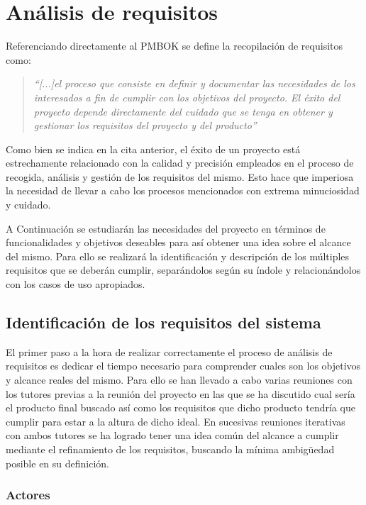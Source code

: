 \chapter{Análisis de requisitos}

Referenciando directamente al PMBOK se define la recopilación de requisitos como:

\begin{quote}
	\textit{
	“[...]el proceso que consiste en definir y documentar las necesidades de los interesados
	a fin de cumplir con los objetivos del proyecto. El éxito del proyecto depende directamente
	del cuidado que se tenga en obtener y gestionar los requisitos del proyecto y del
	producto”
	}
\end{quote}

Como bien se indica en la cita anterior, el éxito de un proyecto está estrechamente relacionado con la calidad y precisión empleados en el proceso de recogida, análisis y gestión de los requisitos del mismo. Esto hace que imperiosa la necesidad de llevar a cabo los procesos mencionados con extrema minuciosidad y cuidado.

\bigskip

A Continuación se estudiarán las necesidades del proyecto en términos de funcionalidades y objetivos deseables para así obtener una idea sobre el alcance del mismo. Para ello se realizará la identificación y descripción de los múltiples requisitos que se deberán cumplir, separándolos según su índole y relacionándolos con los casos de uso apropiados.

\section{Identificación de los requisitos del sistema}

El primer paso a la hora de realizar correctamente el proceso de análisis de requisitos es dedicar el tiempo necesario para comprender cuales son los objetivos y alcance reales del mismo. Para ello se han llevado a cabo varias reuniones con los tutores previas a la reunión del proyecto en las que se ha discutido cual sería el producto final buscado así como los requisitos que dicho producto tendría que cumplir para estar a la altura de dicho ideal. En sucesivas reuniones iterativas con ambos tutores se ha logrado tener una idea común del alcance a cumplir mediante el refinamiento de los requisitos, buscando la mínima ambigüedad posible en su definición.

\subsection{Actores}

